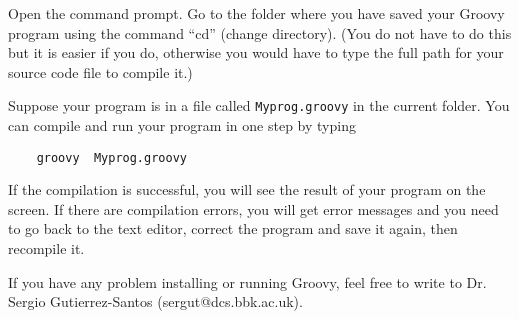 Open the command prompt. 
Go to the folder where you have saved your Groovy
program using the command ``cd'' (change directory). (You do not have to
do this but it is easier if you do, otherwise you would have to type the full
path for your source code file to compile it.)

Suppose your program is in a file called 
\texttt{Myprog.groovy} in the current folder. 
You can compile and run your program in one step by typing 

\begin{Verbatim}
    groovy  Myprog.groovy
\end{Verbatim}

If the compilation is successful, you will see the result of your
program on the screen.
%
If there are compilation errors, you will get error messages and you need
to go back to the text editor, correct the program and save it again,
then recompile it. 

If you have any problem installing or running Groovy, feel free to
write to Dr. Sergio Gutierrez-Santos (sergut@dcs.bbk.ac.uk).




